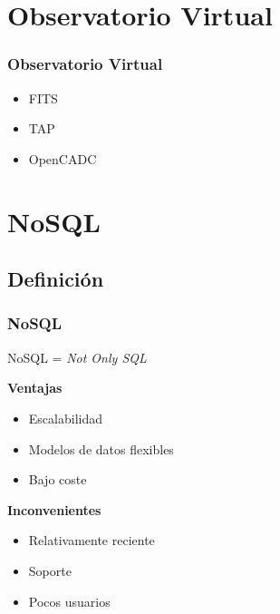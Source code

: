 \documentclass[serif,12pt]{beamer}
\begin{document}
\section{Observatorio Virtual}
\begin{frame}
\frametitle{Observatorio Virtual}

\begin{itemize}
\item FITS
\item TAP
\item OpenCADC
\end{itemize}

\end{frame}


\section{NoSQL}
\subsection{Definición}
\begin{frame}
\frametitle{NoSQL}

\begin{center}
NoSQL = \emph{Not Only SQL} \newline
\end{center}


\begin{multicols}{2}

\textbf{Ventajas}
\begin{itemize}
\item Escalabilidad
\item Modelos de datos flexibles
\item Bajo coste
\end{itemize}

\textbf{Inconvenientes}
\begin{itemize}
\item Relativamente reciente
\item Soporte
\item Pocos usuarios
\end{itemize}

\end{multicols}

\end{frame}
\end{document}
